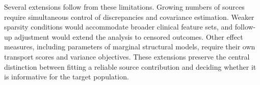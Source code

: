 \documentclass[12pt]{article}
\begin{document}
Several extensions follow from these limitations. Growing numbers of sources require simultaneous control of discrepancies and covariance estimation. Weaker sparsity conditions would accommodate broader clinical feature sets, and follow-up adjustment would extend the analysis to censored outcomes. Other effect measures, including parameters of marginal structural models, require their own transport scores and variance objectives. These extensions preserve the central distinction between fitting a reliable source contribution and deciding whether it is informative for the target population.

\clearpage

\clearpage
\newcommand{\FACEHDINMAIN}{}

\end{document}
